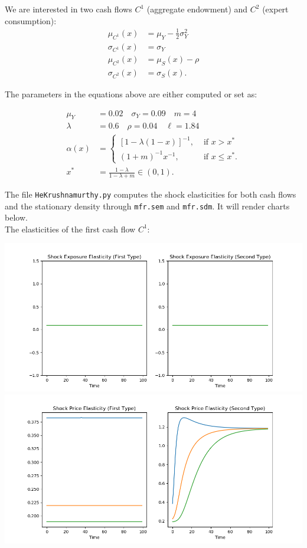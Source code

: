 \documentclass[12pt]{article}
\newcommand{\sdmProg}{mfr.sdm\xspace}
\newcommand{\semProg}{mfr.sem\xspace}
\begin{document}
We are interested in two cash flows $C^1$ (aggregate endowment) and $C^2$ (expert consumption):
\begin{align*}
	\mu_{C^1}(x) &= \mu_Y - \frac{1}{2} \sigma_Y^2 \\
	\sigma_{C^1}(x) &= \sigma_Y \\
	\mu_{C^2}(x) &= \mu_S(x) - \rho \\
	\sigma_{C^2}(x) &= \sigma_S(x).
\end{align*}

The parameters in the equations above are either computed or set as:

\begin{align*}
	\mu_Y &= 0.02 \quad \sigma_Y = 0.09 \quad m = 4 \\
	\lambda &= 0.6 \quad \rho = 0.04 \quad \ell = 1.84\\
	\alpha(x) &= \begin{cases} [1-\lambda(1-x)]^{-1}, &\text{ if } x > x^* \\
						(1+m)^{-1} x^{-1}, &\text{ if } x \le x^*. \end{cases} \\
	x^* &= \frac{1-\lambda}{1-\lambda+m} \in (0,1).
\end{align*}

The file \texttt{HeKrushnamurthy.py} computes the shock elasticities for both cash flows and the stationary density through \texttt{\semProg} and \texttt{\sdmProg}. It  will render charts below.\\

The elasticities of the first cash flow $C^1$: \\
\begin{center}
\includegraphics[scale=.4]{HK_expoC1.png}  \\
\includegraphics[scale=.4]{HK_priceC1.png} \\
\end{center}
\end{document}
